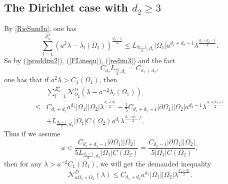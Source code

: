 \documentclass[11pt,letterpaper]{amsart}
\numberwithin{equation}{section}
\theoremstyle{plain}
\theoremstyle{plain}
\numberwithin{equation}{section}
\theoremstyle{remark}
\begin{document}
	\subsection{The Dirichlet case with $d_2 \ge 3$}\label{subsec23}
	
	By \eqref{RieSumIn}, one has
	\begin{equation}\label{redim3} 
		\sum_{l=1}^{Z^\lambda_a} (a^2\lambda- \lambda_l(\Omega_1))^{\frac{d_2-1}{2}}\le L_{\frac{d_2-1}{2},d_1} |\Omega_1| a^{d_1+d_2-1} \lambda^{\frac{d_1+d_2-1}{2}}.
	\end{equation}
	So by (\ref{proddim2}), (\ref{FLinequ}), (\ref{redim3}) and the fact 
	\[C_{d_2} L_{\frac{d_2}{2},d_1} = C_{d_1+d_2},\]
	one has that if $a^2\lambda> C_1(\Omega_1)$, then
	\[
	\begin{aligned}
		&\sum_{l=1}^{Z^\lambda_a} \mathcal N^D_{\Omega_2} (\lambda- a^{-2}\lambda_l(\Omega_1))\\
		\le&C_{d_1+d_2}a^{d_1}|\Omega_1||\Omega_2|\lambda^{\frac{d_1+d_2}{2}}-\frac{1}{5} C_{d_1+d_2-1} |\partial \Omega_1| |\Omega_2|a^{d_1-1}\lambda^{\frac{d_1+d_2-1}{2}}\\
		&+ L_{\frac{d_2-1}{2}, d_1}|\Omega_1| C(\Omega_2) a^{d_1}\lambda^{\frac{d_1+d_2-1}{2}}.
	\end{aligned}
	\]
	Thus if we assume
	\[a< \frac{C_{d_1+d_2-1} |\partial \Omega_1| |\Omega_2|}{5 L_{\frac{d_2-1}{2}, d_1}|\Omega_1| C(\Omega_2) } = \frac{C_{d_2-1} |\partial \Omega_1| |\Omega_2|}{5 |\Omega_1| C(\Omega_2) },\] 
	then for any $\lambda >  a^{-2}C_1(\Omega_1)$, we will get the demanded inequality   
	\[
	\mathcal N^D_{a\Omega_1 \times \Omega_2}(\lambda)\le C_{d_1+d_2}a^{d_1}|\Omega_1||\Omega_2|\lambda^{\frac{d_1+d_2}{2}}.
	\]
	
\end{document}
